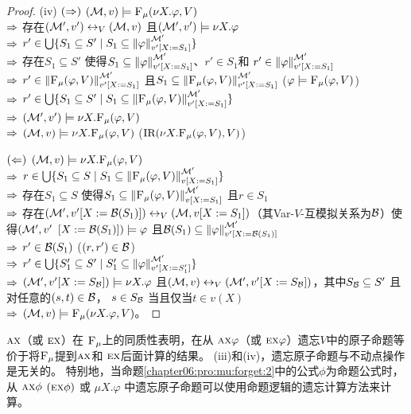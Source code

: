 \begin{proof}
	(iv) $(\Rightarrow)$ $({\cal M},v) \models {\textsc{F}_{\textsc{$\mu$}}}(\nu X. \varphi, V)$\\
	$\Rightarrow$ 存在$({\cal M}', v') \leftrightarrow_V ({\cal M},v)$ 且$({\cal M}',v') \models \nu X. \varphi$\\
	$\Rightarrow$ $r' \in \bigcup \{S_1 \subseteq S' \mid S_1 \subseteq \left\|\varphi\right\|_{v'[X:=S_1]}^{{\cal M}'}\}$\\
	$\Rightarrow$ 存在$S_1 \subseteq S'$ 使得$S_1 \subseteq \left\|\varphi\right\|_{v'[X:=S_1]}^{{\cal M}'}$、$r'\in S_1$和 $r'\in \left\|\varphi\right\|_{v'[X:=S_1]}^{{\cal M}'}$\\
	$\Rightarrow$ $r' \in \left\|{\textsc{F}_{\textsc{$\mu$}}}(\varphi,V)\right\|_{v'[X:=S_1]}^{{\cal M}'}$ 且$S_1 \subseteq \left\|{\textsc{F}_{\textsc{$\mu$}}}(\varphi,V)\right\|_{v'[X:=S_1]}^{{\cal M}'}$ \hfill ($\varphi \models {\textsc{F}_{\textsc{$\mu$}}}(\varphi,V)$)\\
	$\Rightarrow$ $r'\in \bigcup \{S_1 \subseteq S' \mid S_1 \subseteq \left\|{\textsc{F}_{\textsc{$\mu$}}}(\varphi,V)\right\|_{v'[X:=S_1]}^{{\cal M}'}\}$\\
	$\Rightarrow$ $({\cal M}',v')\models \nu X. {\textsc{F}_{\textsc{$\mu$}}}(\varphi,V)$\\
	$\Rightarrow$ $({\cal M},v) \models \nu X. {\textsc{F}_{\textsc{$\mu$}}}(\varphi,V)$ \hfill  ($\textrm{IR}(\nu X. {\textsc{F}_{\textsc{$\mu$}}}(\varphi,V), V)$)
	
	$(\Leftarrow)$ $({\cal M},v)\models \nu X. {\textsc{F}_{\textsc{$\mu$}}}(\varphi,V)$\\
	$\Rightarrow$ $r\in \bigcup \{S_1 \subseteq S \mid S_1 \subseteq \left\|{\textsc{F}_{\textsc{$\mu$}}}(\varphi,V)\right\|_{v[X:=S_1]}^{{\cal M}'}\}$\\
	$\Rightarrow$ 存在$S_1 \subseteq S$ 使得$S_1 \subseteq \left\|{\textsc{F}_{\textsc{$\mu$}}}(\varphi,V)\right\|_{v[X:=S_1]}^{{\cal M}'}$ 且$r \in S_1$\\
	$\Rightarrow$ 存在$({\cal M}',v'[X:={\cal B}(S_1)]) \leftrightarrow_V ({\cal M},v[X:=S_1])$（其Var-$V$-互模拟关系为${\cal B}$）使得$({\cal M}',v'$ $[X:={\cal B}(S_1)]) \models \varphi$ 且${\cal B}(S_1) \subseteq \left\|\varphi\right\|_{v'[X:={\cal B}(S_1)]}^{{\cal M}'}$\\
	$\Rightarrow$ $r'\in {\cal B}(S_1)$ \hfill ($(r,r')\in {\cal B}$)\\
	$\Rightarrow$ $r'\in \bigcup \{S_1' \subseteq S' \mid S_1' \subseteq \left\|\varphi\right\|_{v'[X:=S_1']}^{{\cal M}'}\}$\\
	$\Rightarrow$ $({\cal M}',v'[X:=S_{{\cal B}}]) \models \nu X. \varphi$ 且$({\cal M},v) \leftrightarrow_V ({\cal M}',v'[X:=S_{{\cal B}}])$，其中$S_{{\cal B}} \subseteq S'$ 且对任意的$(s,t)\in {\cal B}$， $s\in S_{{\cal B}}$ 当且仅当$t\in v(X)$\\
	$\Rightarrow$ $({\cal M}, v) \models {\textsc{F}_{\textsc{$\mu$}}}(\nu X. \varphi, V)$。
\end{proof}


$\textsc{a}\textsc{x}$（或 $\textsc{e}\textsc{x}$）在 ${\textsc{F}_{\textsc{$\mu$}}}$上的同质性表明，在从 $\textsc{a}\textsc{x} \varphi$（或 $\textsc{e}\textsc{x} \varphi$）遗忘$V$中的原子命题等价于将${\textsc{F}_{\textsc{$\mu$}}}$提到$\textsc{a}\textsc{x}$和 $\textsc{e} \textsc{x}$后面计算的结果。
(iii)和(iv)，遗忘原子命题与不动点操作是无关的。
特别地，当命题\ref{chapter06:pro:mu:forget:2}中的公式$\phi$为命题公式时，从
$\textsc{a}\textsc{x} \phi$ $(\textsc{e}\textsc{x} \phi)$ 或 $\mu X. \varphi$ 中遗忘原子命题可以使用命题逻辑的遗忘计算方法来计算。

